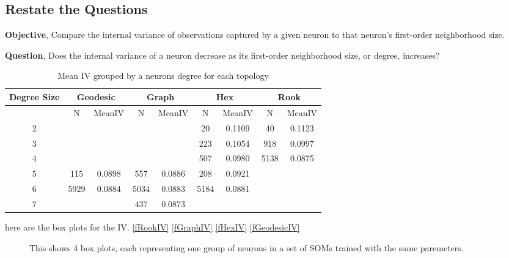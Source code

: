 \subsection{Restate the Questions}
\textbf{Objective}, Compare the internal variance of observations captured by a given
neuron to that neuron's first-order neighborhood size.

\textbf{Question}, Does the internal variance of a neuron decrease as its first-order
neighborhood size, or degree, increases?




\begin{table}
\caption{Mean IV grouped by a neurons degree for each topology}
\label{meanvar1}
\begin{tabular}{|c||c|c||c|c||c|c||c|c|}
\hline
\textbf{Degree Size} & \multicolumn{2}{c||}{\textbf{Geodesic}} &
\multicolumn{2}{c||}{\textbf{Graph}} & \multicolumn{2}{c||}{\textbf{Hex}} &
\multicolumn{2}{c|}{\textbf{Rook}} \\
\hline
& N & MeanIV & N & MeanIV & N & MeanIV & N & MeanIV \\
\hline
2&&&&& 20& 0.1109& 40& 0.1123\\ 
3&&&&& 223& 0.1054& 918& 0.0997\\ 
4&&&&& 507& 0.0980& 5138& 0.0875\\ 
5& 115& 0.0898& 557& 0.0886& 208& 0.0921&&\\ 
6& 5929& 0.0884& 5034& 0.0883& 5184& 0.0881&&\\ 
7&&& 437& 0.0873&&&&\\ 
\hline
\end{tabular} \end{table}

here are the box plots for the IV. \ref{fRookIV} \ref{fGraphIV} \ref{fHexIV}
\ref{fGeodesicIV}


\begin{figure}
\label{boxplot}
\centering
{}
\caption{This shows 4 box plots, each representing one group of neurons in a set
of SOMs trained with the same paremeters.}
\end{figure}




